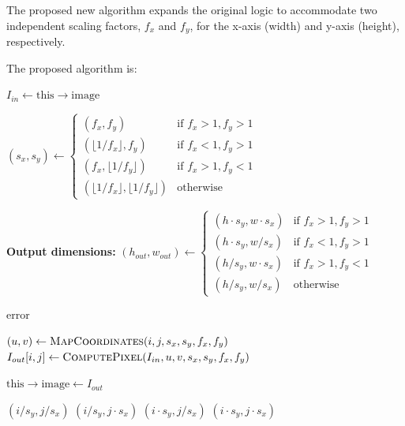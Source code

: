 \documentclass[10pt]{article}
\begin{document}
The proposed new algorithm expands the original logic to accommodate two independent scaling factors, $f_x$ and $f_y$, for the x-axis (width) and y-axis (height), respectively.

The proposed algorithm is:

\begin{algorithm}
\caption{Asymmetric Image Resize}
\begin{algorithmic}[1]
    \State $I_{in} \gets \text{this} \rightarrow \text{image}$ 
    
    \State $(s_x, s_y) \gets \begin{cases}
        (f_x, f_y) & \text{if } f_x > 1, f_y > 1 \\
        (\lfloor 1/f_x \rfloor, f_y) & \text{if } f_x < 1, f_y > 1 \\
        (f_x, \lfloor 1/f_y \rfloor) & \text{if } f_x > 1, f_y < 1 \\
        (\lfloor 1/f_x \rfloor, \lfloor 1/f_y \rfloor) & \text{otherwise}
    \end{cases}$
    
    \State \textbf{Output dimensions:} $(h_{out}, w_{out}) \gets \begin{cases}
        (h \cdot s_y, w \cdot s_x) & \text{if } f_x > 1, f_y > 1 \\
        (h \cdot s_y, w / s_x) & \text{if } f_x < 1, f_y > 1 \\
        (h / s_y, w \cdot s_x) & \text{if } f_x > 1, f_y < 1 \\
        (h / s_y, w / s_x) & \text{otherwise}
    \end{cases}$
    
        \State \Return error
    \EndIf
    
    \For{$(i,j) \in [0,h_{out}) \times [0,w_{out})$}
        \State $(u,v) \gets \Call{MapCoordinates}{i,j,s_x,s_y,f_x,f_y}$
        \State $I_{out}[i,j] \gets \Call{ComputePixel}{I_{in},u,v,s_x,s_y,f_x,f_y}$
    \EndFor
    
      \EndIf
    \State $\text{this} \rightarrow \text{image} \gets I_{out}$
\EndProcedure
\end{algorithmic}
\end{algorithm}

\begin{algorithm}
\caption{Pixel Coordinate Mapping}
\begin{algorithmic}[1]
     \Return $(i/s_y, j/s_x)$ \EndIf
     \Return $(i/s_y, j \cdot s_x)$ \EndIf  
     \Return $(i \cdot s_y, j/s_x)$ \EndIf
     \Return $(i \cdot s_y, j \cdot s_x)$ \EndIf
\EndFunction
\end{algorithmic}
\end{algorithm}
\end{document}
